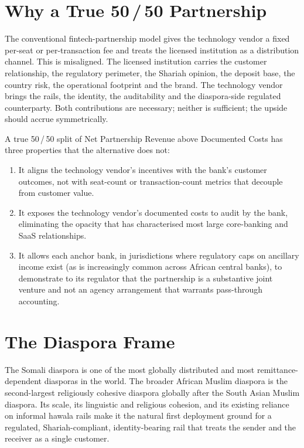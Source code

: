 \documentclass[11pt,letterpaper]{article}
\begin{document}
\section{Why a True 50\,/\,50 Partnership}

The conventional fintech-partnership model gives the technology vendor
a fixed per-seat or per-transaction fee and treats the licensed
institution as a distribution channel. This is misaligned. The
licensed institution carries the customer relationship, the regulatory
perimeter, the Shariah opinion, the deposit base, the country risk,
the operational footprint and the brand. The technology vendor brings
the rails, the identity, the auditability and the diaspora-side
regulated counterparty. Both contributions are necessary; neither is
sufficient; the upside should accrue symmetrically.

A true 50\,/\,50 split of Net Partnership Revenue above Documented
Costs has three properties that the alternative does not:
\begin{enumerate}[leftmargin=1.6em]
  \item It aligns the technology vendor's incentives with the bank's
        customer outcomes, not with seat-count or transaction-count
        metrics that decouple from customer value.
  \item It exposes the technology vendor's documented costs to audit
        by the bank, eliminating the opacity that has characterised
        most large core-banking and SaaS relationships.
  \item It allows each anchor bank, in jurisdictions where regulatory
        caps on ancillary income exist (as is increasingly common
        across African central banks), to demonstrate to its regulator
        that the partnership is a substantive joint venture and not an
        agency arrangement that warrants pass-through accounting.
\end{enumerate}

\section{The Diaspora Frame}

The Somali diaspora is one of the most globally distributed and most
remittance-dependent diasporas in the world. The broader African
Muslim diaspora is the second-largest religiously cohesive diaspora
globally after the South Asian Muslim diaspora. Its scale, its
linguistic and religious cohesion, and its existing reliance on
informal hawala rails make it the natural first deployment ground for
a regulated, Shariah-compliant, identity-bearing rail that treats the
sender and the receiver as a single customer.
\end{document}
